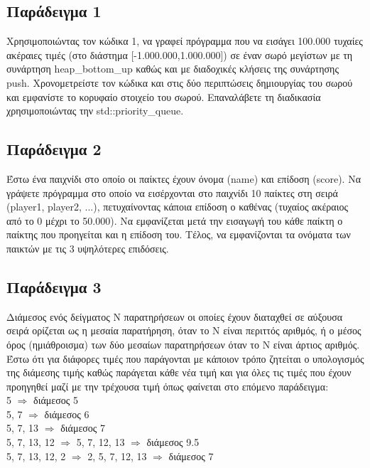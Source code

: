 \subsection{Παράδειγμα 1}
Χρησιμοποιώντας τον κώδικα 1, να γραφεί πρόγραμμα που να εισάγει 100.000 τυχαίες ακέραιες τιμές (στο διάστημα [-1.000.000,1.000.000]) σε έναν σωρό μεγίστων με τη συνάρτηση heap\_bottom\_up καθώς και με διαδοχικές κλήσεις της συνάρτησης push. Χρονομετρείστε τον κώδικα και στις δύο περιπτώσεις δημιουργίας του σωρού και εμφανίστε το κορυφαίο στοιχείο του σωρού. Επαναλάβετε τη διαδικασία χρησιμοποιώντας την std::priority\_queue.





\subsection{Παράδειγμα 2}
Έστω ένα παιχνίδι στο οποίο οι παίκτες έχουν όνομα (name) και επίδοση (score). Να γράψετε πρόγραμμα στο οποίο να εισέρχονται στο παιχνίδι 10 παίκτες στη σειρά (player1, player2, ...), πετυχαίνοντας κάποια επίδοση ο καθένας (τυχαίος ακέραιος από το 0 μέχρι το 50.000). Να εμφανίζεται μετά την εισαγωγή του κάθε παίκτη ο παίκτης που προηγείται και η επίδοση του. Τέλος, να εμφανίζονται τα ονόματα των παικτών με τις 3 υψηλότερες επιδόσεις.






\subsection{Παράδειγμα 3}
Διάμεσος ενός δείγματος Ν παρατηρήσεων οι οποίες έχουν διαταχθεί σε αύξουσα σειρά ορίζεται ως η μεσαία παρατήρηση, όταν το Ν είναι περιττός αριθμός, ή ο μέσος όρος (ημιάθροισμα) των δύο μεσαίων παρατηρήσεων όταν το Ν είναι άρτιος αριθμός. 
Έστω ότι για διάφορες τιμές που παράγονται με κάποιον τρόπο ζητείται ο υπολογισμός της διάμεσης  τιμής καθώς παράγεται κάθε νέα τιμή και για όλες τις τιμές που έχουν προηγηθεί μαζί με την τρέχουσα τιμή όπως φαίνεται στο επόμενο παράδειγμα:\\ 
5  $\Rightarrow$  διάμεσος 5\\
5, 7 $\Rightarrow$ διάμεσος 6\\
5, 7, 13 $\Rightarrow$ διάμεσος 7\\
5, 7, 13, 12 $\Rightarrow$ 5, 7, 12, 13 $\Rightarrow$ διάμεσος 9.5\\
5, 7, 13, 12, 2 $\Rightarrow$ 2, 5, 7, 12, 13 $\Rightarrow$ διάμεσος 7

